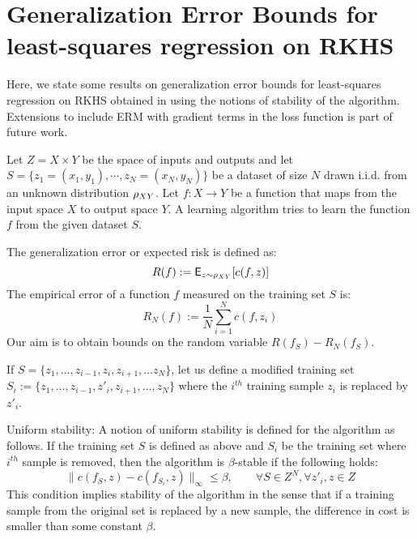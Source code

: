 \chapter{Generalization Error Bounds for least-squares regression on RKHS }%
\label{a:bousquet}
Here, we state some results on generalization error bounds for least-squares regression on RKHS obtained in \cite{boueli01} using the notions of stability of the algorithm.
Extensions to include ERM with gradient terms in the loss function is part of future work. 

Let $Z = X \times Y$ be the space of inputs and outputs and let $S = \{z_1 = (x_1, y_1), \cdots,z_N = (x_N,y_N)\}$ be a dataset of size $N$ drawn i.i.d. from an unknown distribution $\rho_{XY}$. Let $f:X \to Y$ be a function that maps from the input space $X$ to output space $Y$. A learning algorithm tries to learn the function $f$ from the given dataset $S$. 

The generalization error or expected risk is defined as:
\[
R(f) := {\sf E}_{z \sim \rho_{XY}} [c(f,z)]
\]
The empirical error of a function $f$ measured on the training set $S$ is:
\[
R_N(f) := \frac{1}{N}\sum_{i=1}^N c(f,z_i)
\]
Our aim is to obtain bounds on the random variable $R(f_S) - R_N(f_S)$. 

If $S = \{z_1,\dots, z_{i-1},z_i,z_{i+1},\dots z_N\}$, let us define a modified training set $S_i :=\{z_1,\dots, z_{i-1},z'_i,z_{i+1},\dots,z_N\}$ where the $i^{th}$ training sample $z_i$ is replaced by $z'_i$.

Uniform stability: A notion of uniform stability is defined for the algorithm as follows. If the training set $S$ is defined as above and $S_i$ be the training set where $i^{th}$ sample is removed, then the algorithm is $\beta$-stable if the following holds:
\[
\|c(f_S, z ) - c(f_{S_i},z)\|_{\infty} \leq \beta, \qquad \forall S \in Z^N, \forall z'_i, z \in Z
\]
This condition implies stability of the algorithm in the sense that if a training sample from the original set is replaced by a new sample, the difference in cost is smaller than some constant $\beta$. 

